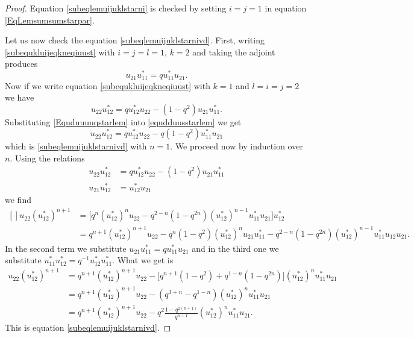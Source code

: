 \begin{proof}
    Equation \eqref{subeqlemuijuklstarni} is checked by setting \( i=j=1\) in equation \eqref{EqLemsumsumstarpar}. 

    Let us now check the equation \eqref{subeqlemuijuklstarnivd}. First, writing \eqref{subequkluijeqkneqiuust} with \( i=j=l=1\), \( k=2\)  and taking the adjoint produces
    \begin{equation}        \label{Equduuuuqstarlem}
        u_{21}u_{11}^*=qu_{11}^*u_{21}.
    \end{equation}
    Now if we write equation \eqref{subequkluijeqkneqiuust} with \( k=1\) and \( l=i=j=2\) we have
    \begin{equation}        \label{equdduusstarlem}
        u_{22}u_{12}^*=qu_{12}^*u_{22}-(1-q^2)u_{21}u_{11}^*.
    \end{equation}
    Substituting \eqref{Equduuuuqstarlem} into \eqref{equdduusstarlem} we get
    \begin{equation}
        u_{22}u_{12}^*=qu_{12}^*u_{22}-q(1-q^2)u_{11}^*u_{21}
    \end{equation}
    which is \eqref{subeqlemuijuklstarnivd} with \( n=1\). We proceed now by induction over \( n\). Using the relations
    \begin{subequations}
        \begin{align}
            u_{22}u_{12}^*&=qu_{12}^*u_{22}-(1-q^2)u_{21}u_{11}^*\\
            u_{21}u_{12}^*&=u_{12}^*u_{21}
        \end{align}
    \end{subequations}
    we find
    \begin{equation}
        \begin{aligned}[]
            u_{22}(u_{12}^*)^{n+1}&=\big[ q^n(u_{12}^*)^nu_{22}-q^{2-n}(1-q^{2n})(u_{12}^*)^{n-1}u_{11}^*u_{21} \big]u_{12}^*\\
            &=q^{n+1}(u_{12}^*)^{n+1}u_{22}-q^n(1-q^2)(u_{12}^*)^nu_{21}u_{11}^*-q^{2-n}(1-q^{2n})(u_{12}^*)^{n-1}u_{11}^*u_{12}u_{21}.
        \end{aligned}
    \end{equation}
    In the second term we substitute \( u_{21}u_{11}^*=qu_{11}^*u_{21}\) and in the third one we substitute \( u_{11}^*u_{12}^*=q^{-1}u_{12}^*u_{11}^*\). What we get is
    \begin{subequations}
        \begin{align}
            u_{22}(u_{12}^*)^{n+1}&=q^{n+1}(u_{12}^*)^{n+1}u_{22}-\big[ q^{n+1}(1-q^2)+q^{1-n}(1-q^{2n}) \big](u_{12}^*)^nu_{11}^*u_{21}\\
            &=q^{n+1}(u_{12}^*)^{n+1}u_{22}-(q^{3+n}-q^{1-n})(u_{12}^*)^nu_{11}^*u_{21}\\
            &=q^{n+1}(u_{12}^*)^{n+1}u_{22}-q^2\frac{ 1-q^{2(n+1)} }{ q^{n+1} }(u_{12}^*)^nu_{11}^*u_{21}.
        \end{align}
    \end{subequations}
    This is equation \eqref{subeqlemuijuklstarnivd}.


\end{proof}
